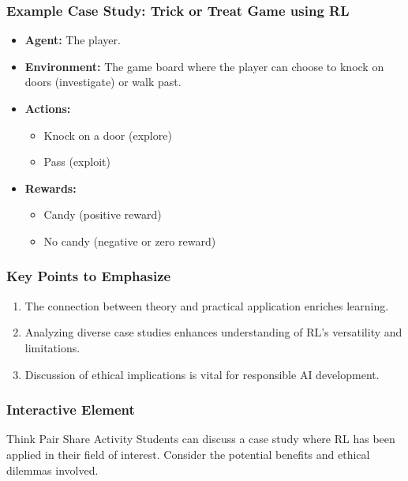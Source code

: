 \documentclass[aspectratio=169]{beamer}
\begin{document}
\begin{frame}[fragile]
    \frametitle{Example Case Study: Trick or Treat Game using RL}
    \begin{itemize}
        \item \textbf{Agent:} The player.
        \item \textbf{Environment:} The game board where the player can choose to knock on doors (investigate) or walk past.
        \item \textbf{Actions:} 
            \begin{itemize}
                \item Knock on a door (explore)
                \item Pass (exploit)
            \end{itemize}
        \item \textbf{Rewards:} 
            \begin{itemize}
                \item Candy (positive reward)
                \item No candy (negative or zero reward)
            \end{itemize}
    \end{itemize}
\end{frame}

\begin{frame}[fragile]
    \frametitle{Key Points to Emphasize}
    \begin{enumerate}
        \item The connection between theory and practical application enriches learning.
        \item Analyzing diverse case studies enhances understanding of RL's versatility and limitations.
        \item Discussion of ethical implications is vital for responsible AI development.
    \end{enumerate}
\end{frame}

\begin{frame}[fragile]
    \frametitle{Interactive Element}
    \begin{block}{Think Pair Share Activity}
        Students can discuss a case study where RL has been applied in their field of interest. Consider the potential benefits and ethical dilemmas involved.
    \end{block}
\end{frame}
\end{document}

